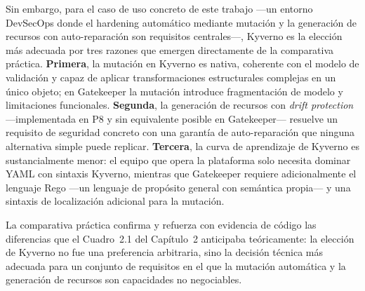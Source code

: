 Sin embargo, para el caso de uso concreto de este trabajo ---un entorno DevSecOps donde el hardening automático mediante mutación y la generación de recursos con auto-reparación son requisitos centrales---, Kyverno es la elección más adecuada por tres razones que emergen directamente de la comparativa práctica. \textbf{Primera}, la mutación en Kyverno es nativa, coherente con el modelo de validación y capaz de aplicar transformaciones estructurales complejas en un único objeto; en Gatekeeper la mutación introduce fragmentación de modelo y limitaciones funcionales. \textbf{Segunda}, la generación de recursos con \textit{drift protection} ---implementada en P8 y sin equivalente posible en Gatekeeper--- resuelve un requisito de seguridad concreto con una garantía de auto-reparación que ninguna alternativa simple puede replicar. \textbf{Tercera}, la curva de aprendizaje de Kyverno es sustancialmente menor: el equipo que opera la plataforma solo necesita dominar YAML con sintaxis Kyverno, mientras que Gatekeeper requiere adicionalmente el lenguaje Rego ---un lenguaje de propósito general con semántica propia--- y una sintaxis de localización adicional para la mutación.

La comparativa práctica confirma y refuerza con evidencia de código las diferencias que el Cuadro~2.1 del Capítulo~2 anticipaba teóricamente: la elección de Kyverno no fue una preferencia arbitraria, sino la decisión técnica más adecuada para un conjunto de requisitos en el que la mutación automática y la generación de recursos son capacidades no negociables.
